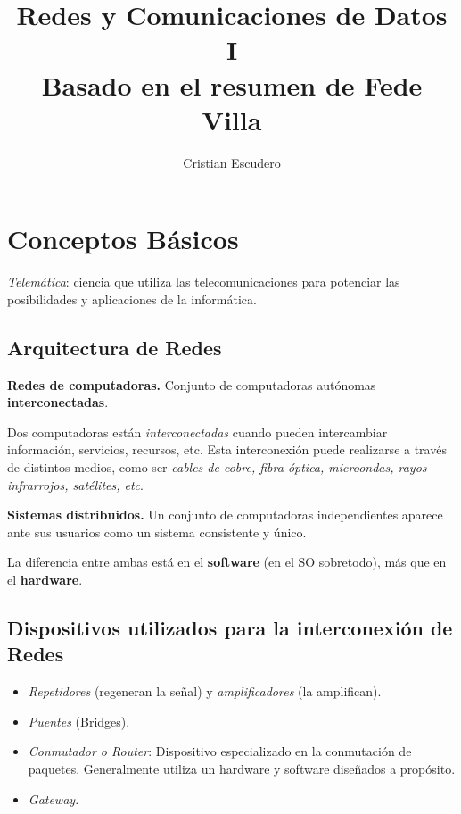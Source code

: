 \documentclass[10pt,a4paper]{article}
\author{Cristian Escudero}
\title{Redes y Comunicaciones de Datos I \\ \small{Basado en el resumen de Fede Villa}}
\begin{document}
\maketitle

\section{Conceptos Básicos}

\textit{Telemática}: ciencia que utiliza las telecomunicaciones para potenciar las posibilidades y aplicaciones de la informática.

\subsection{Arquitectura de Redes}
\begin{description}
\item \textbf{Redes de computadoras.} Conjunto de computadoras autónomas \textbf{interconectadas}.

Dos computadoras están \textit{interconectadas} cuando pueden intercambiar información, servicios, recursos, etc. Esta interconexión puede realizarse a través de distintos medios, como ser \textit{cables de cobre, fibra óptica, microondas, rayos infrarrojos, satélites, etc}. 

\item \textbf{Sistemas distribuidos.} Un conjunto de computadoras independientes aparece ante sus usuarios como un sistema consistente y único.
\end{description}
La diferencia entre ambas está en el \textbf{software} (en el SO sobretodo), más que en el \textbf{hardware}.

\subsection{Dispositivos utilizados para la interconexión de Redes}

\begin{itemize}
\item \textit{Repetidores} (regeneran la señal) y \textit{amplificadores} (la amplifican).
\item \textit{Puentes} (Bridges).
\item \textit{Conmutador o Router}: Dispositivo especializado en la conmutación de paquetes. Generalmente utiliza un hardware y software diseñados a propósito.
\item \textit{Gateway}.
\end{itemize}
\end{document}
